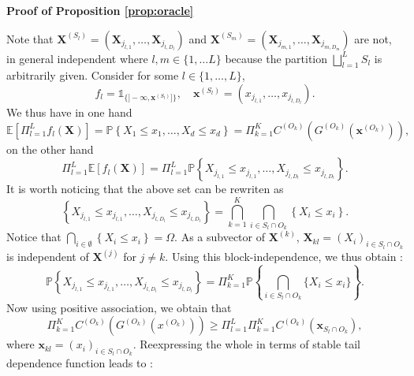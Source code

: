 \documentclass[11pt]{article}
\makeatletter
\renewenvironment{proof}[1][\proofname]{\par
\pushQED{\qed}%
\normalfont \topsep6\p@\@plus6\p@\relax
\trivlist
\item\relax
{\textbf{
#1\@addpunct{ }}}\hspace\labelsep\ignorespaces
}{%
\popQED\endtrivlist\@endpefalse
}
\makeatother
\begin{document}
	\begin{proof}[Proof of Proposition \ref{prop:oracle}]
		Note that $\textbf{X}^{(S_l)} = (\textbf{X}_{j_{l,1}}, \dots, \textbf{X}_{j_{l,D_l}})$ and $\textbf{X}^{(S_m)} = (\textbf{X}_{j_{m,1}}, \dots, \textbf{X}_{j_{m,D_m}})$ are not, in general independent where $l,m \in \{1,\dots L\}$ because the partition $\bigsqcup_{l=1}^L S_l$ is arbitrarily given. Consider for some $l \in \{1,\dots, L\}$,
		\begin{equation*}
			f_l = \mathds{1}_{\{]-\infty, \textbf{x}^{(S_l)}]\}}, \quad \textbf{x}^{(S_l)} = (x_{j_{l,1}}, \dots, x_{j_{l,D_l}}).
		\end{equation*}
		We thus have in one hand
		\begin{equation*}
			\mathbb{E}\left[ \Pi_{l=1}^L f_l(\textbf{X})\right] = \mathbb{P} \left\{ X_1 \leq x_1, \dots, X_d \leq x_d\right\} = \Pi_{k=1}^K C^{(O_k)}\left( G^{(O_k)}(\textbf{x}^{(O_k)})\right),
		\end{equation*}
		on the other hand
		\begin{equation*}
			\Pi_{l=1}^L \mathbb{E}\left[ f_l(\textbf{X})\right] = \Pi_{l=1}^L \mathbb{P}\left\{ X_{j_{l,1}} \leq x_{j_{l,1}}, \dots, X_{j_{l,D_l}} \leq x_{j_{l,D_l}}\right\}.
		\end{equation*}
		It is worth noticing that the above set can be rewriten as 
		\begin{equation*}
			\left\{ X_{j_{l,1}} \leq x_{j_{l,1}}, \dots, X_{j_{l,D_l}} \leq x_{j_{l,D_l}} \right\} = \bigcap_{k=1}^K \bigcap_{i \in S_l \cap O_k} \left\{ X_i \leq x_i \right\}.
		\end{equation*}
		Notice that $\bigcap_{i \in \emptyset} \left\{ X_i \leq x_i \right\} = \Omega$. As a subvector of $\textbf{X}^{(k)}$, $\textbf{X}_{kl} = ( X_i )_{i \in S_l \cap O_k}$ is independent of $\textbf{X}^{(j)}$ for $j \neq k$. Using this block-independence, we thus obtain :
		\begin{equation*}
			\mathbb{P}\left\{ X_{j_{l,1}} \leq x_{j_{l,1}}, \dots, X_{j_{l,D_l}} \leq x_{j_{l,D_l}} \right\} = \Pi_{k=1}^K \mathbb{P}\left\{ \bigcap_{i \in S_l \cap O_k } \{X_i \leq x_i \} \right\}.
		\end{equation*}
		Now using positive association, we obtain that
		\begin{equation*}
			\Pi_{k=1}^K C^{(O_k)}\left( G^{(O_k)}(x^{(O_k)})\right) \geq \Pi_{l=1}^L \Pi_{k=1}^K C^{(O_k)}\left(\textbf{x}_{S_l \cap O_k} \right),
		\end{equation*}
		where $\textbf{x}_{kl} = (x_i)_{i \in S_l \cap O_k}$. Reexpressing the whole in terms of stable tail dependence function leads to :

\end{proof}
\end{document}
